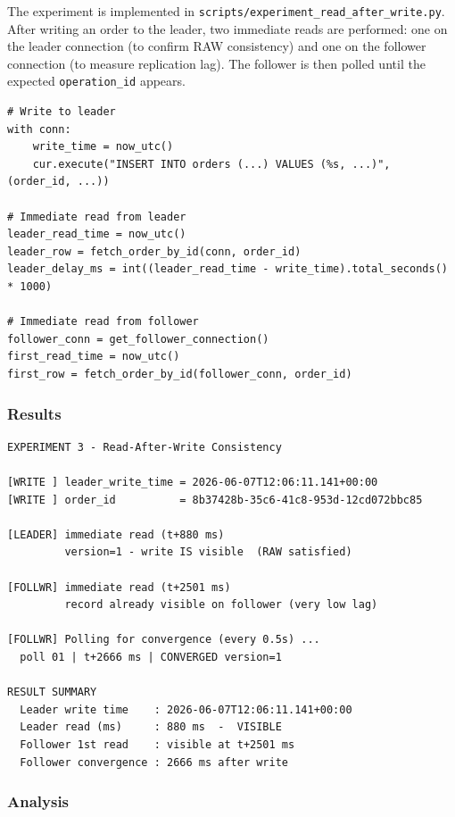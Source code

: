 \documentclass[12pt,a4paper]{article}
\begin{document}
The experiment is implemented in \texttt{scripts/experiment\_read\_after\_write.py}.
After writing an order to the leader, two immediate reads are performed:
one on the leader connection (to confirm RAW consistency) and one on the follower
connection (to measure replication lag). The follower is then polled until the
expected \texttt{operation\_id} appears.

\begin{lstlisting}[style=pythonstyle, caption={Leader and follower reads -- Experiment 3 (excerpt)}]
# Write to leader
with conn:
    write_time = now_utc()
    cur.execute("INSERT INTO orders (...) VALUES (%s, ...)", (order_id, ...))

# Immediate read from leader
leader_read_time = now_utc()
leader_row = fetch_order_by_id(conn, order_id)
leader_delay_ms = int((leader_read_time - write_time).total_seconds() * 1000)

# Immediate read from follower
follower_conn = get_follower_connection()
first_read_time = now_utc()
first_row = fetch_order_by_id(follower_conn, order_id)
\end{lstlisting}

\subsubsection{Results}

\begin{lstlisting}[style=outputstyle, caption={Experiment 3 output}]
EXPERIMENT 3 - Read-After-Write Consistency

[WRITE ] leader_write_time = 2026-06-07T12:06:11.141+00:00
[WRITE ] order_id          = 8b37428b-35c6-41c8-953d-12cd072bbc85

[LEADER] immediate read (t+880 ms)
         version=1 - write IS visible  (RAW satisfied)

[FOLLWR] immediate read (t+2501 ms)
         record already visible on follower (very low lag)

[FOLLWR] Polling for convergence (every 0.5s) ...
  poll 01 | t+2666 ms | CONVERGED version=1

RESULT SUMMARY
  Leader write time    : 2026-06-07T12:06:11.141+00:00
  Leader read (ms)     : 880 ms  -  VISIBLE
  Follower 1st read    : visible at t+2501 ms
  Follower convergence : 2666 ms after write
\end{lstlisting}

\subsubsection{Analysis}
\end{document}
